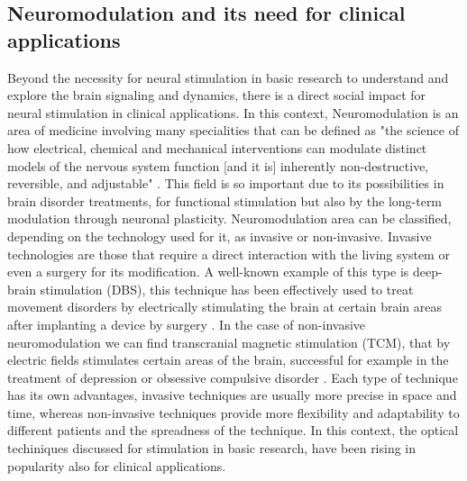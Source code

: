 \subsection{Neuromodulation and its need for clinical applications}


Beyond the necessity for neural stimulation in basic research to understand and explore the brain signaling and dynamics, there is a direct social impact for neural stimulation in clinical applications. In this context, Neuromodulation is an area of medicine involving many specialities that can be defined as "the science of how electrical, chemical and mechanical interventions can modulate distinct models of the nervous system function [and it is] inherently non-destructive, reversible, and adjustable" \parencite{krames_neuromodulation_2009}. This field is so important due to its possibilities in brain disorder treatments, for functional stimulation but also by the long-term modulation through neuronal plasticity. Neuromodulation area can be classified, depending on the technology used for it, as invasive or non-invasive. Invasive technologies are those that require a direct interaction with the living system or even a surgery for its modification. A well-known example of this type is deep-brain stimulation (DBS), this technique has been effectively used to treat movement disorders by electrically stimulating the brain at certain brain areas after implanting a device by surgery \parencite{limousin_long-term_2019, hariz_deep_2022}. In the case of non-invasive neuromodulation we can find transcranial magnetic stimulation (TCM), that by electric fields stimulates certain areas of the brain, successful for example in the treatment of depression or obsessive compulsive disorder \parencite{valero-cabre_transcranial_2017, clarke_patients_2018}. Each type of technique has its own advantages, invasive techniques are usually more precise in space and time, whereas non-invasive techniques provide more flexibility and adaptability to different patients and the spreadness of the technique. In this context, the optical techiniques discussed for stimulation in basic research, have been rising in popularity also for clinical applications. 











